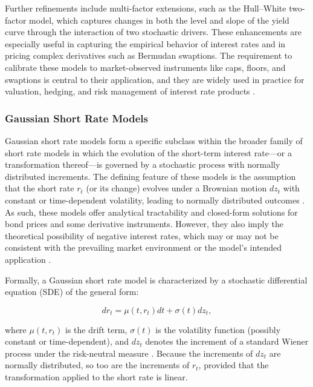 Further refinements include multi-factor extensions, such as the Hull–White two-factor model, which captures changes in both the level and slope of the yield curve through the interaction of two stochastic drivers. These enhancements are especially useful in capturing the empirical behavior of interest rates and in pricing complex derivatives such as Bermudan swaptions. The requirement to calibrate these models to market-observed instruments like caps, floors, and swaptions is central to their application, and they are widely used in practice for valuation, hedging, and risk management of interest rate products \parencite[p.~719]{hull2015optionsfutures}.

\subsubsection{Gaussian Short Rate Models} \label{gaussian_short_rate_models}
Gaussian short rate models form a specific subclass within the broader family of short rate models in which the evolution of the short-term interest rate—or a transformation thereof—is governed by a stochastic process with normally distributed increments. The defining feature of these models is the assumption that the short rate $r_t$ (or its change) evolves under a Brownian motion $dz_t$ with constant or time-dependent volatility, leading to normally distributed outcomes \parencite[p.~53]{brigo2006interest}. As such, these models offer analytical tractability and closed-form solutions for bond prices and some derivative instruments. However, they also imply the theoretical possibility of negative interest rates, which may or may not be consistent with the prevailing market environment or the model’s intended application \parencite[pp.~719--720]{hull2015optionsfutures}.

Formally, a Gaussian short rate model is characterized by a stochastic differential equation (SDE) of the general form:

\begin{equation}
dr_t = \mu(t, r_t) dt + \sigma(t) dz_t,
\end{equation}


where $\mu(t, r_t)$ is the drift term, $\sigma(t)$ is the volatility function (possibly constant or time-dependent), and $dz_t$ denotes the increment of a standard Wiener process under the risk-neutral measure \parencite[p.~53]{brigo2006interest}. Because the increments of $dz_t$ are normally distributed, so too are the increments of $r_t$, provided that the transformation applied to the short rate is linear.

